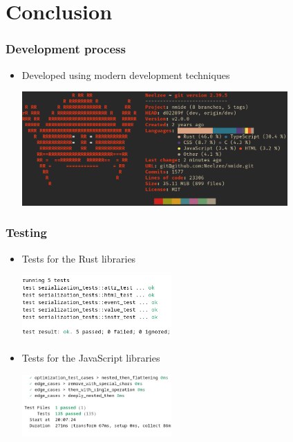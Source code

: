\section{Conclusion}
\SectionPage

\begin{frame}
  \frametitle{Development process}
  \begin{itemize}
    \item Developed using modern development techniques
    \pause
    \begin{center}
      \includegraphics[width=0.8\textwidth]{./pics/onefetch.png}
    \end{center}
  \end{itemize}
\end{frame}

\begin{frame}
  \frametitle{Testing}
  \begin{itemize}
    \item Tests for the Rust libraries
    \pause
    \begin{center}
      \includegraphics[width=0.45\textwidth]{./pics/librstest.png}
    \end{center}
    \pause
    \item Tests for the JavaScript libraries
    \pause
    \begin{center}
      \includegraphics[width=0.45\textwidth]{./pics/libtest.png}
    \end{center}
  \end{itemize}
\end{frame}

